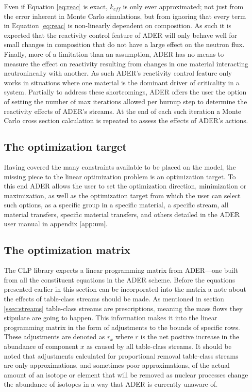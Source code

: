 Even if Equation \ref{eq:reac} is exact, $k_{eff}$ is only ever approximated;
not just from the error inherent in Monte Carlo simulations, but from
ignoring that every term in Equation \ref{eq:reac} is non-linearly dependent
on composition. As such it is expected that the reactivity control feature of
ADER will only behave well for small changes in composition that do not have a
large effect on the neutron flux. Finally, more of a limitation than an
assumption, ADER has no means to measure the effect on reactivity resulting
from changes in one material interacting neutronincally with another. As such 
ADER's reactivity control feature only works in situations where one 
material is the dominant driver of criticality in a system. Partially 
to address these shortcomings, ADER offers the user the option of setting the
number of max iterations allowed per burnup step to determine the reactivity 
effects of
ADER's streams. At the end of each such iteration a Monte Carlo cross section
calculation is repeated to assess the effects of ADER's actions.



\subsection{The optimization target} \label{ssec:opt_target}
Having covered the many constraints available to be placed
on the model, the missing piece to the linear optimization 
problem is an optimization target. To this end ADER allows the user
to set the optimization direction, minimization or maximization, as well as
the optimization target from which the user can select such options, as a
specific group in a specific material, a specific stream, 
all material transfers, specific material transfers, and others detailed in the
ADER user manual in appendix \ref{app:um}.


\subsection{The optimization matrix} \label{ssec:opt_matrix}

The CLP library expects a linear programming matrix from ADER---one built from
all the constituent equations in the ADER scheme. Before the equations 
presented earlier in this section can be incorporated into the matrix a note
about the effects of table-class streams should be made. As mentioned in section
\ref{ssec:streams} table-class streams are prescriptions, meaning the mass 
flows they
stipulate are going to happen. This information makes it into the linear
programming matrix in the form of adjustments to the bounds of specific rows.
These adjustments are denoted
as $r_{x}$ where $r$ is the net positive increase in the abundance of
component $x$ as caused by all table-class streams. It should be noted that
adjustments calculated for proportional removal table-class streams are only
approximations, and sometimes poor approximations, of the actual amount of an
isotope or element that will be removed as nuclear processes change the 
abundance of isotopes in a way that ADER is currently unaware of.

